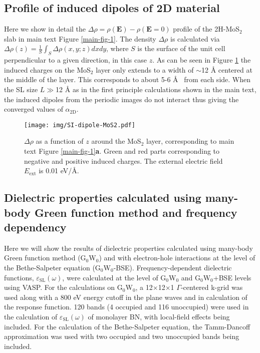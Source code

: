 \documentclass[journal=ancac3,email=true,hyperref=true,keywords=false]{achemso}
\begin{document}
\subsection{Profile of induced dipoles of 2D material}
\label{sec:dipole-plot}
Here we show in detail the
$\Delta {\rho}=\rho(\boldsymbol{E}) - \rho(\boldsymbol{E}=0)$ profile of
the 2H-MoS$_{2}$ slab in main text Figure \ref{main-fig-1}. The
density $\Delta \rho$ is calculated via $\Delta \rho(z) = \frac{1}{S} \int_{S} \Delta \rho (x,y;z) dx dy $, 
where $S$ is the surface of the unit cell perpendicular to a given direction, in this case $z$. 
%
As can be seen in Figure \ref{fig:rho-profile} the induced charges on
the MoS$_{2}$ layer only extends to a width of $\sim{}$12 \AA{}
centered at the middle of the layer. This corresponds to about 5-6 \AA~
from each side.  When the SL size $L \gg$12 \AA{} as in the first
principle calculations shown in the main text, the induced dipoles from
the periodic images do not interact thus giving the converged
values of $\alpha_{\mathrm{2D}}$.

\begin{figure}[htbp]
 \centering
 \texttt{[image: img/SI-dipole-MoS2.pdf]}
 \caption{$\Delta \rho$ as a function of $z$ around the
   MoS$_{2}$ layer, corresponding to main text Figure
   \ref{main-fig-1}\textbf{a}. Green and red parts corresponding to negative and
   positive induced charges. The external electric field
   $E_{\mathrm{ext}}$ is 0.01 eV/\AA{}.}
 \label{fig:rho-profile}
\end{figure}

\subsection{Dielectric properties calculated using many-body Green function method and frequency dependency}
\label{ssec:gw}

Here we will show the results of dielectric properties calculated
using many-body Green function method (G$_{0}$W$_{0}$) and with
electron-hole interactions at the level of the Bethe-Salpeter equation
(G$_{0}$W$_{0}$-BSE). Frequency-dependent dielectric functions,
$\varepsilon_{\mathrm{SL}}(\omega)$, were calculated at the level of
G$_{0}$W$_{0}$ and G$_{0}$W$_{0}$+BSE levels using VASP. For the
calculations on G$_{0}$W$_{0}$, a 12$\times$12$\times$1 $\Gamma$-centered k-grid was
used along with a 800 eV energy cutoff in the plane waves and in
calculation of the response function. 120 bands (4 occupied and 116
unoccupied) were used in the calculation of
$\varepsilon_{\mathrm{SL}}(\omega)$ of monolayer BN, with local-field
effects being included. For the calculation of the
Bethe-Salpeter equation, the Tamm-Dancoff approximation was used with
two occupied and two unoccupied bands being included. 
\end{document}
